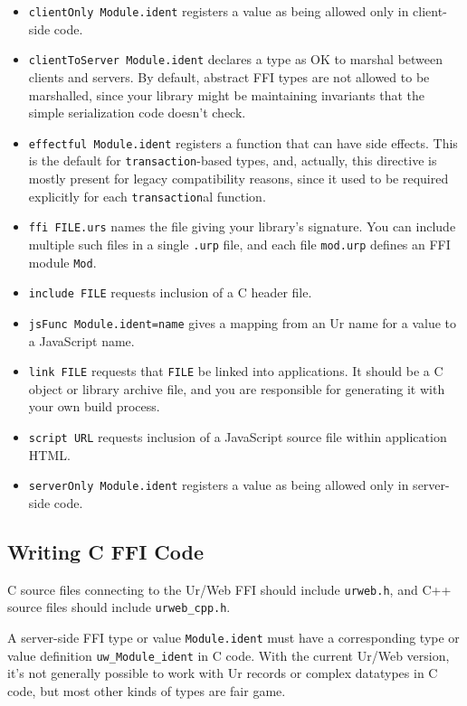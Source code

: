 \documentclass{article}
\begin{document}
\begin{itemize}
\item \texttt{clientOnly Module.ident} registers a value as being allowed only in client-side code.
\item \texttt{clientToServer Module.ident} declares a type as OK to marshal between clients and servers.  By default, abstract FFI types are not allowed to be marshalled, since your library might be maintaining invariants that the simple serialization code doesn't check.
\item \texttt{effectful Module.ident} registers a function that can have side effects.  This is the default for \texttt{transaction}-based types, and, actually, this directive is mostly present for legacy compatibility reasons, since it used to be required explicitly for each \texttt{transaction}al function.
\item \texttt{ffi FILE.urs} names the file giving your library's signature.  You can include multiple such files in a single \texttt{.urp} file, and each file \texttt{mod.urp} defines an FFI module \texttt{Mod}.
\item \texttt{include FILE} requests inclusion of a C header file.
\item \texttt{jsFunc Module.ident=name} gives a mapping from an Ur name for a value to a JavaScript name.
\item \texttt{link FILE} requests that \texttt{FILE} be linked into applications.  It should be a C object or library archive file, and you are responsible for generating it with your own build process.
\item \texttt{script URL} requests inclusion of a JavaScript source file within application HTML.
\item \texttt{serverOnly Module.ident} registers a value as being allowed only in server-side code.
\end{itemize}

\subsection{Writing C FFI Code}

C source files connecting to the Ur/Web FFI should include \texttt{urweb.h}, and C++ source files should include \texttt{urweb\_cpp.h}.

A server-side FFI type or value \texttt{Module.ident} must have a corresponding type or value definition \texttt{uw\_Module\_ident} in C code.  With the current Ur/Web version, it's not generally possible to work with Ur records or complex datatypes in C code, but most other kinds of types are fair game.
\end{document}
